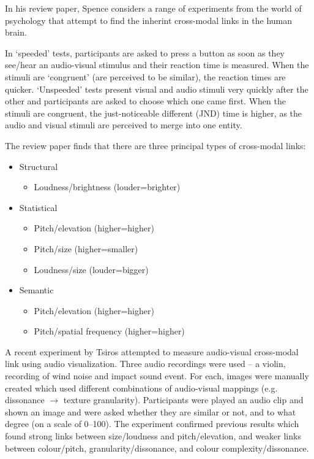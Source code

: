 In his review paper, Spence \citep{Spence2011} considers a range of experiments
from the world of psychology that attempt to find the inherint cross-modal
links in the human brain.

In `speeded' tests, participants are asked to press a button as soon as they
see/hear an audio-visual stimulus and their reaction time is measured. When the
stimuli are `congruent' (are perceived to be similar), the reaction times are
quicker.  `Unspeeded' tests present visual and audio stimuli very quickly after
the other and participants are asked to choose which one came first. When the
stimuli are congruent, the just-noticeable different (JND) time is higher, as
the audio and visual stimuli are perceived to merge into one entity.

The review paper finds that there are three principal types of cross-modal
links:
{\singlespacing
\begin{itemize}
  \item Structural
  \begin{itemize}
    \item Loudness/brightness (louder=brighter)
  \end{itemize}
  \item Statistical
  \begin{itemize}
    \item Pitch/elevation (higher=higher)
    \item Pitch/size (higher=smaller)
    \item Loudness/size (louder=bigger)
  \end{itemize}
  \item Semantic
  \begin{itemize}
    \item Pitch/elevation (higher=higher)
    \item Pitch/spatial frequency (higher=higher)
  \end{itemize}
\end{itemize}
}

A recent experiment by Tsiros \citep{Tsiros2014} attempted to measure
audio-visual cross-modal link using audio visualization. Three audio recordings
were used -- a violin, recording of wind noise and impact sound event. For
each, images were manually created which used different combinations of
audio-visual mappings (e.g. dissonance $\to$ texture granularity). Participants
were played an audio clip and shown an image and were asked whether they are
similar or not, and to what degree (on a scale of 0--100).  The experiment
confirmed previous results which found strong links between size/loudness and
pitch/elevation, and weaker links between colour/pitch, granularity/dissonance,
and colour complexity/dissonance.


